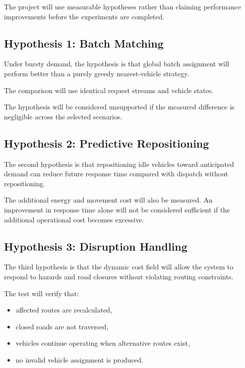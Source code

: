 \documentclass[12pt,a4paper]{article}
\begin{document}
The project will use measurable hypotheses rather than claiming
performance improvements before the experiments are completed.

\subsection{Hypothesis 1: Batch Matching}

Under bursty demand, the hypothesis is that global batch assignment
will perform better than a purely greedy nearest-vehicle strategy.

The comparison will use identical request streams and vehicle states.

The hypothesis will be considered unsupported if the measured
difference is negligible across the selected scenarios.

\subsection{Hypothesis 2: Predictive Repositioning}

The second hypothesis is that repositioning idle vehicles toward
anticipated demand can reduce future response time compared with
dispatch without repositioning.

The additional energy and movement cost will also be measured. An
improvement in response time alone will not be considered sufficient
if the additional operational cost becomes excessive.

\subsection{Hypothesis 3: Disruption Handling}

The third hypothesis is that the dynamic cost field will allow the
system to respond to hazards and road closures without violating
routing constraints.

The test will verify that:

\begin{itemize}
    \item affected routes are recalculated,
    \item closed roads are not traversed,
    \item vehicles continue operating when alternative routes exist,
    \item no invalid vehicle assignment is produced.
\end{itemize}
\end{document}
